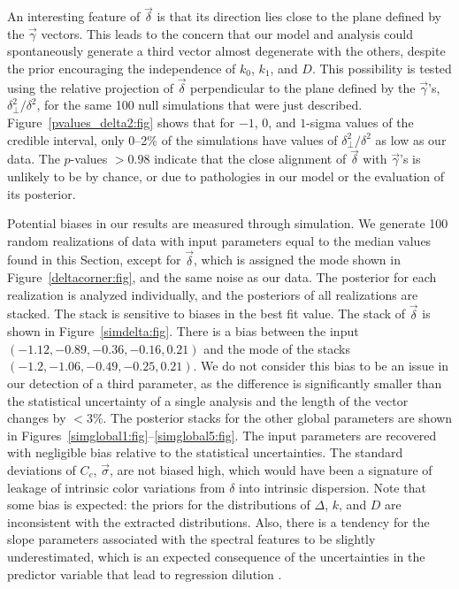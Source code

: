 \documentclass{aastex61}   	%
\begin{document}
An interesting feature of $\vec{\delta}$ is that its direction lies close to the plane defined by the
$\vec{\gamma}$ vectors.
This leads to the concern that our model and analysis  could spontaneously generate a third
vector almost degenerate with the others, despite the prior 
encouraging
 the independence of $k_0$, $k_1$, and $D$.
This
possibility
 is tested using the 
relative projection of $\vec{\delta}$  perpendicular to the plane defined by the $\vec{\gamma}$'s, $\delta_\perp^2/\delta^2$,
for the same 100 null simulations that were just described.
Figure~\ref{pvalues_delta2:fig} shows  that for 
 $-1$, 0, and $1$-sigma
values of  the credible interval, only 0--2\% of the simulations have values of  $\delta_\perp^2/\delta^2$ as low as our data.
The $p$-values $>0.98$ indicate that 
 the close alignment of $\vec{\delta}$  with  $\vec{\gamma}$'s is unlikely to be by chance,
\color{red}
or due to pathologies in our model or the evaluation of its posterior.
\color{black}


Potential biases in our results are measured through simulation.
We generate 100 random realizations of data with input  parameters equal to the median values found in
this Section, except for $\vec{\delta}$, which is assigned
the mode shown in Figure~\ref{deltacorner:fig},
and the same noise as our data.  The posterior for each realization is analyzed individually, and the posteriors of all realizations are stacked.  The stack is sensitive to
biases in the best fit value.
The stack of  $\vec{\delta}$  is shown in Figure~\ref{simdelta:fig}.  There is a bias between
the input  $(-1.12, -0.89, -0.36,  -0.16, 0.21)$ and the mode of  the stacks $(-1.2, -1.06, -0.49, -0.25, 0.21)$.
We do not consider this bias to be an issue in our detection of a third parameter, as the difference is significantly
smaller than the statistical uncertainty of a single analysis and the length of the vector changes by $< 3\%$.
The posterior stacks for the other global parameters 
are shown in Figures~\ref{simglobal1:fig}--\ref{simglobal5:fig}.  The input parameters are recovered with negligible bias
relative to the statistical uncertainties. 
\color{red}
The standard deviations of $C_c$, $\vec{\sigma}$,  are not biased high, which would have been a signature of leakage of
intrinsic color variations from $\delta$ into intrinsic dispersion.
\color{black}
Note that some bias is expected: the priors for the distributions of $\Delta$, $k$, and $D$ are inconsistent
with the extracted distributions.  Also, 
there is a tendency for the slope parameters associated with the spectral features to be slightly underestimated, which is an expected consequence of 
the uncertainties in the predictor variable that lead to 
regression dilution \citep{spearman04}.
\end{document}
